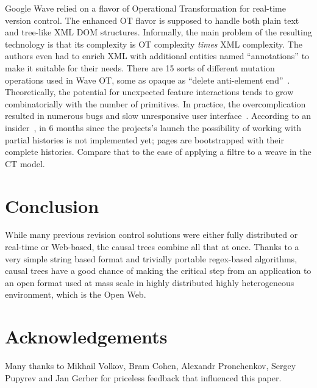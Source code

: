 \documentclass{acm_proc_article-sp}
\begin{document}
Google Wave relied on a flavor of Operational Transformation for
real-time version control. The enhanced OT flavor is supposed to
handle both plain text and tree-like XML DOM structures.
Informally, the main problem of the resulting technology is that
its complexity is OT complexity \emph{times} XML complexity. 
The authors even had to enrich XML with additional entities 
named ``annotations'' to make it suitable for their needs.
There are 15 sorts of different mutation operations used in Wave
OT, some as opaque as ``delete anti-element end''~\cite{waveot}.
Theoretically, the potential for unexpected feature interactions
tends to grow combinatorially with the number of primitives.
In practice, the overcomplication resulted in numerous bugs and
slow unresponsive user interface~\cite{own-experience}.
According to an insider~\cite{gerasimov}, in 6 months since the
projects's launch the possibility of working with partial
histories is not  implemented yet; pages are bootstrapped with
their complete histories. Compare that to the ease of applying
a filtre to a weave in the CT model.


\section {Conclusion} \label{sec:conclusion}

While many previous revision control solutions were either
fully distributed or real-time or Web-based, the causal trees
combine all that at once. Thanks to a very simple string based
format and trivially portable regex-based algorithms, causal trees
have a good chance of making the critical step from an
application to an open format used at mass scale in highly
distributed highly heterogeneous environment, which is the Open Web.


\section{Acknowledgements}

Many thanks to Mikhail Volkov, Bram Cohen,
Alexandr Pronchenkov, Sergey Pupyrev and Jan Gerber for priceless
feedback that influenced this paper.




\end{document}
